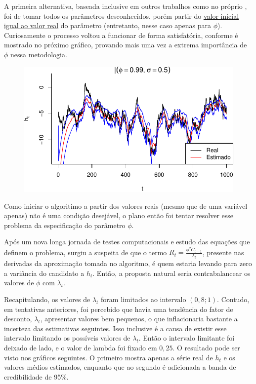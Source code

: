 \documentclass[12pt, a4paper]{article}
\begin{document}
A primeira alternativa, baseada inclusive em outros trabalhos como no próprio \kastner, foi de tomar todos os parâmetros desconhecidos, porém partir do \underline{valor inicial igual ao valor real} do parâmetro (entretanto, nesse caso apenas para $\phi$). Curiosamente o processo voltou a funcionar de forma satisfatória, conforme é mostrado no próximo gráfico, provando mais uma vez a extrema importância de $\phi$ nessa metodologia.

\begin{figure}[ht]
  \centering
  \includegraphics{img/p099s05_3}
\end{figure}

Como iniciar o algoritimo a partir dos valores reais (mesmo que de uma variável apenas) não é uma condição desejável, o plano então foi tentar resolver esse problema da especificação do parâmetro $\phi$.

Após um nova longa jornada de testes computacionais e estudo das equações que definem o problema, surgiu a suspeita de que o termo $R_t = \frac{\phi^2 C_{t-1}}{\lambda_t}$, presente nas derivadas da aproximação tomada no algoritmo, é quem estaria levando para zero a variância do candidato a $h_t$. Então, a proposta natural seria contrabalancear os valores de $\phi$ com $\lambda_t$.

Recapitulando, os valores de $\lambda_t$ foram limitados ao intervalo $(0,8; 1)$. Contudo, em tentativas anteriores, foi percebido que havia uma tendência do fator de desconto, $\lambda_t$, apresentar valores bem pequenos, o que inflacionaria bastante a incerteza das estimativas seguintes. Isso inclusive é a causa de existir esse intervalo limitando os possíveis valores de $\lambda_t$. Então o intervalo limitante foi deixado de lado, e o valor de lambda foi fixado em $0,25$. O resultado pode ser visto nos gráficos seguintes. O primeiro mostra apenas a série real de $h_t$ e os valores médios estimados, enquanto que ao segundo é adicionada a banda de credibilidade de 95\%.
\end{document}
